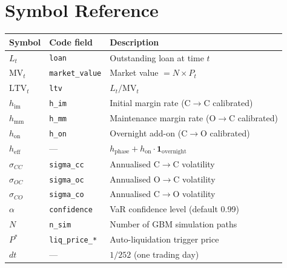 \documentclass[9pt, a4paper]{extarticle}
\begin{document}
\section{Symbol Reference}
\label{sec:symbols}

\begin{tabularx}{\linewidth}{llX}
\toprule
\textbf{Symbol} & \textbf{Code field} & \textbf{Description} \\
\midrule
$L_t$                   & \texttt{loan}            & Outstanding loan at time $t$ \\
$\mathrm{MV}_t$         & \texttt{market\_value}   & Market value $= N \times P_t$ \\
$\mathrm{LTV}_t$        & \texttt{ltv}             & $L_t / \mathrm{MV}_t$ \\
$h_{\mathrm{im}}$       & \texttt{h\_im}           & Initial margin rate (C$\to$C calibrated) \\
$h_{\mathrm{mm}}$       & \texttt{h\_mm}           & Maintenance margin rate (O$\to$C calibrated) \\
$h_{\mathrm{on}}$       & \texttt{h\_on}           & Overnight add-on (C$\to$O calibrated) \\
$h_{\mathrm{eff}}$      & ---                      & $h_{\mathrm{phase}} + h_{\mathrm{on}} \cdot \mathbf{1}_{\mathrm{overnight}}$ \\
$\sigma_{CC}$           & \texttt{sigma\_cc}       & Annualised C$\to$C volatility \\
$\sigma_{OC}$           & \texttt{sigma\_oc}       & Annualised O$\to$C volatility \\
$\sigma_{CO}$           & \texttt{sigma\_co}       & Annualised C$\to$O volatility \\
$\alpha$                & \texttt{confidence}      & VaR confidence level (default 0.99) \\
$N$                     & \texttt{n\_sim}          & Number of GBM simulation paths \\
$P^{*}$                 & \texttt{liq\_price\_*}   & Auto-liquidation trigger price \\
$dt$                    & ---                      & $1/252$ (one trading day) \\
\bottomrule
\end{tabularx}
\end{document}
